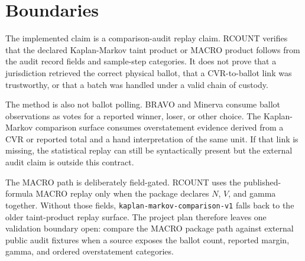 \section{Boundaries}

The implemented claim is a comparison-audit replay claim. RCOUNT verifies that
the declared Kaplan-Markov taint product or MACRO product follows from the audit
record fields and sample-step categories. It does not prove that a jurisdiction
retrieved the correct physical ballot, that a CVR-to-ballot link was trustworthy,
or that a batch was handled under a valid chain of custody.

The method is also not ballot polling. BRAVO and Minerva consume ballot
observations as votes for a reported winner, loser, or other choice. The
Kaplan-Markov comparison surface consumes overstatement evidence derived from a
CVR or reported total and a hand interpretation of the same unit. If that link
is missing, the statistical replay can still be syntactically present but the
external audit claim is outside this contract.

The MACRO path is deliberately field-gated. RCOUNT uses the published-formula
MACRO replay only when the package declares $N$, $V$, and gamma together. Without
those fields, \texttt{kaplan-markov-comparison-v1} falls back to the older
taint-product replay surface. The project plan therefore leaves one validation
boundary open: compare the MACRO package path against external public audit
fixtures when a source exposes the ballot count, reported margin, gamma, and
ordered overstatement categories.
